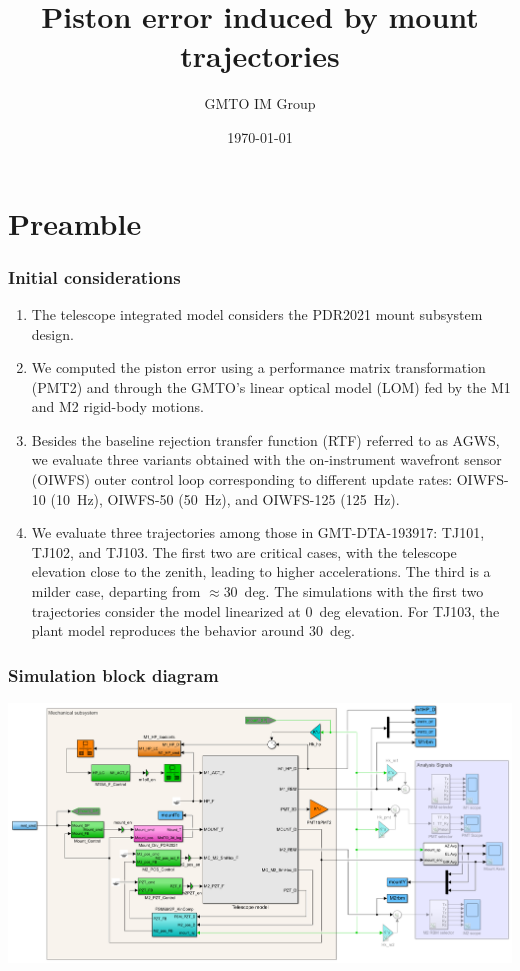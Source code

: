 \documentclass[10pt]{beamer}
\title{Piston error induced by mount trajectories}
\author{GMTO IM Group}
\date{\today}
\begin{document}
\frame{\titlepage}



\section{Preamble}
\frame
{
  \frametitle{Initial considerations}
  \begin{enumerate}
  \item The telescope integrated model considers the PDR2021 mount subsystem design.
  \item We computed the piston error using a performance matrix transformation (PMT2) and through the GMTO's linear optical model (LOM) fed by the M1 and M2 rigid-body motions.
  \item Besides the baseline rejection transfer function (RTF) referred to as AGWS, we evaluate three variants obtained with the on-instrument wavefront sensor (OIWFS) outer control loop corresponding to different update rates: OIWFS-10 (\SI{10}{Hz}), OIWFS-50 (\SI{50}{Hz}), and OIWFS-125 (\SI{125}{Hz}).
  \item We evaluate three trajectories among those in GMT-DTA-193917: TJ101, TJ102, and TJ103. The first two are critical cases, with the telescope elevation close to the zenith, leading to higher accelerations. The third is a milder case, departing from $\approx$\SI{30}{deg}. The simulations with the first two trajectories consider the model linearized at \SI{0}{deg} elevation. For TJ103, the plant model reproduces the behavior around \SI{30}{deg}.
  \end{enumerate}
  
}

\frame
{
  \frametitle{Simulation block diagram}
  \vfill
  \begin{center}
  \includegraphics[width=\textwidth]{sim_diagram.png}      
  \end{center}
\vfill  
}
\end{document}
